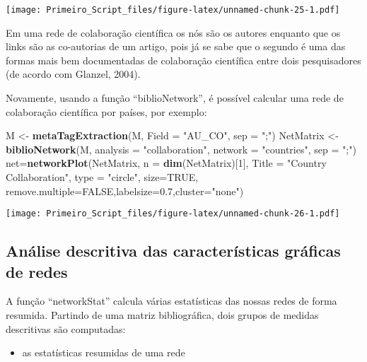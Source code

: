 \documentclass[]{article}
\newenvironment{Shaded}{\begin{snugshade}}{\end{snugshade}}
\newcommand{\DataTypeTok}[1]{\textcolor[rgb]{0.13,0.29,0.53}{#1}}
\newcommand{\DecValTok}[1]{\textcolor[rgb]{0.00,0.00,0.81}{#1}}
\newcommand{\FloatTok}[1]{\textcolor[rgb]{0.00,0.00,0.81}{#1}}
\newcommand{\KeywordTok}[1]{\textcolor[rgb]{0.13,0.29,0.53}{\textbf{#1}}}
\newcommand{\NormalTok}[1]{#1}
\newcommand{\OtherTok}[1]{\textcolor[rgb]{0.56,0.35,0.01}{#1}}
\newcommand{\StringTok}[1]{\textcolor[rgb]{0.31,0.60,0.02}{#1}}
\providecommand{\tightlist}{%
  \setlength{\itemsep}{0pt}\setlength{\parskip}{0pt}}
\begin{document}
\texttt{[image: Primeiro\_Script\_files/figure-latex/unnamed-chunk-25-1.pdf]}

Em uma rede de colaboração científica os nós são os autores enquanto que
os links são as co-autorias de um artigo, pois já se sabe que o segundo
é uma das formas mais bem documentadas de colaboração científica entre
dois pesquisadores (de acordo com Glanzel, 2004).

Novamente, usando a função ``biblioNetwork'', é possível calcular uma
rede de colaboração científica por países, por exemplo:

\begin{Shaded}
\begin{Highlighting}[]
\NormalTok{M <-}\StringTok{ }\KeywordTok{metaTagExtraction}\NormalTok{(M, }\DataTypeTok{Field =} \StringTok{"AU_CO"}\NormalTok{, }\DataTypeTok{sep =} \StringTok{";"}\NormalTok{)}
\NormalTok{NetMatrix <-}\StringTok{ }\KeywordTok{biblioNetwork}\NormalTok{(M, }\DataTypeTok{analysis =} \StringTok{"collaboration"}\NormalTok{, }\DataTypeTok{network =} \StringTok{"countries"}\NormalTok{, }\DataTypeTok{sep =} \StringTok{";"}\NormalTok{)}
\NormalTok{net=}\KeywordTok{networkPlot}\NormalTok{(NetMatrix, }\DataTypeTok{n =} \KeywordTok{dim}\NormalTok{(NetMatrix)[}\DecValTok{1}\NormalTok{], }\DataTypeTok{Title =} \StringTok{"Country Collaboration"}\NormalTok{, }\DataTypeTok{type =} \StringTok{"circle"}\NormalTok{, }\DataTypeTok{size=}\OtherTok{TRUE}\NormalTok{, }\DataTypeTok{remove.multiple=}\OtherTok{FALSE}\NormalTok{,}\DataTypeTok{labelsize=}\FloatTok{0.7}\NormalTok{,}\DataTypeTok{cluster=}\StringTok{"none"}\NormalTok{)}
\end{Highlighting}
\end{Shaded}

\texttt{[image: Primeiro\_Script\_files/figure-latex/unnamed-chunk-26-1.pdf]}

\hypertarget{analise-descritiva-das-caracteristicas-graficas-de-redes}{%
\subsection{Análise descritiva das características gráficas de
redes}\label{analise-descritiva-das-caracteristicas-graficas-de-redes}}

A função ``networkStat'' calcula várias estatísticas das nossas redes de
forma resumida. Partindo de uma matriz bibliográfica, dois grupos de
medidas descritivas são computadas:

\begin{itemize}
\tightlist
\item
  as estatísticas resumidas de uma rede
\end{itemize}
\end{document}
